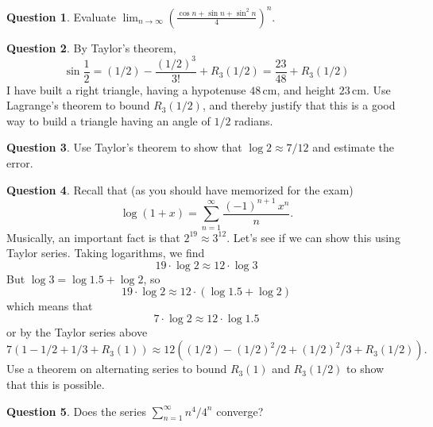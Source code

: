 \documentclass[12pt]{article}
\theoremstyle{definition}
\newtheorem{question}{Question}
\newcommand{\limn}{\displaystyle\lim_{n \to \infty}}
\newcommand{\sumn}{\displaystyle\sum_{n=1}^{\infty}}
\begin{document}
\begin{question}
Evaluate $\limn \left(\displaystyle\frac{\cos n + \sin n + \sin^2 n}{4}\right)^n$.
\end{question}


\begin{question}
By Taylor's theorem,
$$
\sin \frac{1}{2} = (1/2) - \frac{(1/2)^3}{3!} + R_3(1/2) = \frac{23}{48} + R_3(1/2)
$$
I have built a right triangle, having a hypotenuse $48\,\mbox{cm}$,
and height $23\,\mbox{cm}$.  Use Lagrange's theorem to bound
$R_3(1/2)$, and thereby justify that this is a good way to build a
triangle having an angle of $1/2$ radians.
\end{question}

\begin{question}
Use Taylor's theorem to show that
$\log 2 \approx 7/12$ and estimate the error.
\end{question}

\begin{question}
Recall that (as you should have memorized for the exam)
$$
\log (1+x) = \sum_{n=1}^\infty \frac{(-1)^{n+1} \, x^n}{n}.
$$
Musically, an important fact is that $2^{19} \approx 3^{12}$.  Let's
see if we can show this using Taylor series.  Taking logarithms, we find
$$
19 \cdot \log 2 \approx 12 \cdot \log 3
$$
But $\log 3 = \log 1.5 + \log 2$, so
$$
19 \cdot \log 2 \approx 12 \cdot (\log 1.5 + \log 2)
$$
which means that
$$
7 \cdot \log 2 \approx 12 \cdot \log 1.5
$$
or by the Taylor series above
$$
7 \left( 1 - 1/2 + 1/3 + R_3(1) \right) \approx 12 \left( (1/2) - (1/2)^2/2 + (1/2)^2/3 + R_3(1/2) \right).
$$
Use a theorem on alternating series to bound $R_3(1)$ and $R_3(1/2)$ to show that this is possible.
\end{question}

\begin{question}
Does the series $\sumn n^4 / 4^n$ converge?
\end{question}
\end{document}
